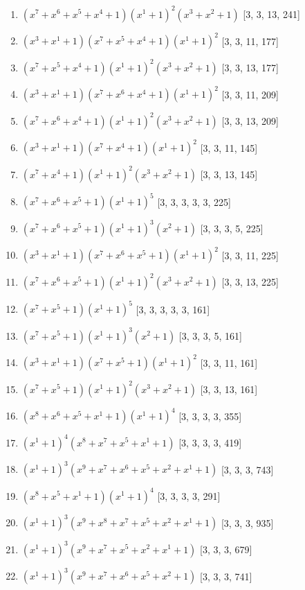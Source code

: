 \documentclass[10pt,twocolumn]{article}
\begin{document}
\begin{enumerate}
\item $(x^{7} + x^{6} + x^{5} + x^{4} + 1)(x^{1} + 1)^{2}(x^{3} + x^{2} + 1)$  [3, 3, 13, 241]
\item $(x^{3} + x^{1} + 1)(x^{7} + x^{5} + x^{4} + 1)(x^{1} + 1)^{2}$  [3, 3, 11, 177]
\item $(x^{7} + x^{5} + x^{4} + 1)(x^{1} + 1)^{2}(x^{3} + x^{2} + 1)$  [3, 3, 13, 177]
\item $(x^{3} + x^{1} + 1)(x^{7} + x^{6} + x^{4} + 1)(x^{1} + 1)^{2}$  [3, 3, 11, 209]
\item $(x^{7} + x^{6} + x^{4} + 1)(x^{1} + 1)^{2}(x^{3} + x^{2} + 1)$  [3, 3, 13, 209]
\item $(x^{3} + x^{1} + 1)(x^{7} + x^{4} + 1)(x^{1} + 1)^{2}$  [3, 3, 11, 145]
\item $(x^{7} + x^{4} + 1)(x^{1} + 1)^{2}(x^{3} + x^{2} + 1)$  [3, 3, 13, 145]
\item $(x^{7} + x^{6} + x^{5} + 1)(x^{1} + 1)^{5}$  [3, 3, 3, 3, 3, 225]
\item $(x^{7} + x^{6} + x^{5} + 1)(x^{1} + 1)^{3}(x^{2} + 1)$  [3, 3, 3, 5, 225]
\item $(x^{3} + x^{1} + 1)(x^{7} + x^{6} + x^{5} + 1)(x^{1} + 1)^{2}$  [3, 3, 11, 225]
\item $(x^{7} + x^{6} + x^{5} + 1)(x^{1} + 1)^{2}(x^{3} + x^{2} + 1)$  [3, 3, 13, 225]
\item $(x^{7} + x^{5} + 1)(x^{1} + 1)^{5}$  [3, 3, 3, 3, 3, 161]
\item $(x^{7} + x^{5} + 1)(x^{1} + 1)^{3}(x^{2} + 1)$  [3, 3, 3, 5, 161]
\item $(x^{3} + x^{1} + 1)(x^{7} + x^{5} + 1)(x^{1} + 1)^{2}$  [3, 3, 11, 161]
\item $(x^{7} + x^{5} + 1)(x^{1} + 1)^{2}(x^{3} + x^{2} + 1)$  [3, 3, 13, 161]
\item $(x^{8} + x^{6} + x^{5} + x^{1} + 1)(x^{1} + 1)^{4}$  [3, 3, 3, 3, 355]
\item $(x^{1} + 1)^{4}(x^{8} + x^{7} + x^{5} + x^{1} + 1)$  [3, 3, 3, 3, 419]
\item $(x^{1} + 1)^{3}(x^{9} + x^{7} + x^{6} + x^{5} + x^{2} + x^{1} + 1)$  [3, 3, 3, 743]
\item $(x^{8} + x^{5} + x^{1} + 1)(x^{1} + 1)^{4}$  [3, 3, 3, 3, 291]
\item $(x^{1} + 1)^{3}(x^{9} + x^{8} + x^{7} + x^{5} + x^{2} + x^{1} + 1)$  [3, 3, 3, 935]
\item $(x^{1} + 1)^{3}(x^{9} + x^{7} + x^{5} + x^{2} + x^{1} + 1)$  [3, 3, 3, 679]
\item $(x^{1} + 1)^{3}(x^{9} + x^{7} + x^{6} + x^{5} + x^{2} + 1)$  [3, 3, 3, 741]

\end{enumerate}
\end{document}
